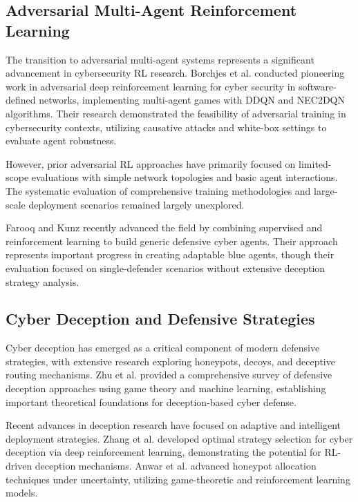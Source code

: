 \documentclass[12pt,oneside,a4paper]{article}
\theoremstyle{definition}
\theoremstyle{plain}
\begin{document}
\subsection{Adversarial Multi-Agent Reinforcement Learning}

The transition to adversarial multi-agent systems represents a significant advancement in cybersecurity RL research. Borchjes et al. \cite{borchjes2023adversarial} conducted pioneering work in adversarial deep reinforcement learning for cyber security in software-defined networks, implementing multi-agent games with DDQN and NEC2DQN algorithms. Their research demonstrated the feasibility of adversarial training in cybersecurity contexts, utilizing causative attacks and white-box settings to evaluate agent robustness.

However, prior adversarial RL approaches have primarily focused on limited-scope evaluations with simple network topologies and basic agent interactions. The systematic evaluation of comprehensive training methodologies and large-scale deployment scenarios remained largely unexplored.

Farooq and Kunz \cite{farooq2025combining} recently advanced the field by combining supervised and reinforcement learning to build generic defensive cyber agents. Their approach represents important progress in creating adaptable blue agents, though their evaluation focused on single-defender scenarios without extensive deception strategy analysis.

\subsection{Cyber Deception and Defensive Strategies}

Cyber deception has emerged as a critical component of modern defensive strategies, with extensive research exploring honeypots, decoys, and deceptive routing mechanisms. Zhu et al. \cite{zhu2021survey} provided a comprehensive survey of defensive deception approaches using game theory and machine learning, establishing important theoretical foundations for deception-based cyber defense.

Recent advances in deception research have focused on adaptive and intelligent deployment strategies. Zhang et al. \cite{zhang2022optimal} developed optimal strategy selection for cyber deception via deep reinforcement learning, demonstrating the potential for RL-driven deception mechanisms. Anwar et al. \cite{anwar2022honeypot} advanced honeypot allocation techniques under uncertainty, utilizing game-theoretic and reinforcement learning models.
\end{document}
